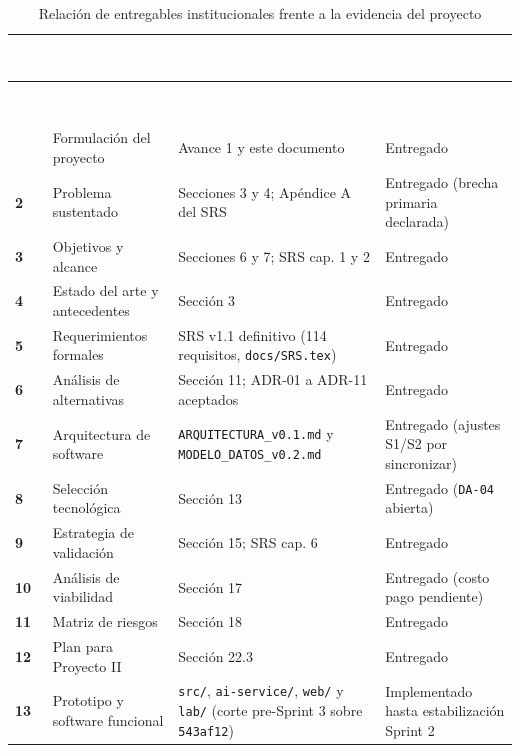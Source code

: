 \documentclass[12pt,a4paper]{article}
\begin{document}
\begingroup
{}
\scriptsize
\begin{longtable}{>{\bfseries}p{} p{} p{} p{}}
\toprule
\rowcolor{utbblue}
\textcolor{white}{\textbf{N.º}} & \textcolor{white}{\textbf{Entregable exigido}} & \textcolor{white}{\textbf{Evidencia en el repositorio}} & \textcolor{white}{\textbf{Estado}} \\
\midrule
\endfirsthead
\toprule
\rowcolor{utbblue}
\textcolor{white}{\textbf{N.º}} & \textcolor{white}{\textbf{Entregable exigido}} & \textcolor{white}{\textbf{Evidencia en el repositorio}} & \textcolor{white}{\textbf{Estado}} \\
\midrule
\endhead
\bottomrule
\caption{Relación de entregables institucionales frente a la evidencia del proyecto}
\label{tab:entregables}
\endlastfoot
1 & Formulación del proyecto & Avance 1 y este documento & Entregado \\
2 & Problema sustentado & Secciones 3 y 4; Apéndice A del SRS & Entregado (brecha primaria declarada) \\
3 & Objetivos y alcance & Secciones 6 y 7; SRS cap. 1 y 2 & Entregado \\
4 & Estado del arte y antecedentes & Sección 3 & Entregado \\
5 & Requerimientos formales & SRS v1.1 definitivo (114 requisitos, \texttt{docs/SRS.tex}) & Entregado \\
6 & Análisis de alternativas & Sección 11; ADR-01 a ADR-11 aceptados & Entregado \\
7 & Arquitectura de software & \texttt{ARQUITECTURA\_v0.1.md} y \texttt{MODELO\_DATOS\_v0.2.md} & Entregado (ajustes S1/S2 por sincronizar) \\
8 & Selección tecnológica & Sección 13 & Entregado (\texttt{DA-04} abierta) \\
9 & Estrategia de validación & Sección 15; SRS cap. 6 & Entregado \\
10 & Análisis de viabilidad & Sección 17 & Entregado (costo pago pendiente) \\
11 & Matriz de riesgos & Sección 18 & Entregado \\
12 & Plan para Proyecto II & Sección 22.3 & Entregado \\
13 & Prototipo y software funcional & \texttt{src/}, \texttt{ai-service/}, \texttt{web/} y \texttt{lab/} (corte pre-Sprint 3 sobre \texttt{543af12}) & Implementado hasta estabilización Sprint 2 \\
\end{longtable}
\endgroup
\end{document}
